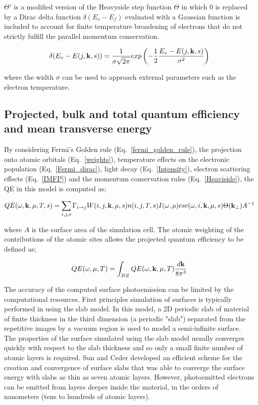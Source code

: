 \documentclass[a4paper,11pt,twoside]{book}
\begin{document}
$\Theta'$ is a modified version of the Heavyside step function $\Theta$ in which $0$ is replaced by a Dirac delta function $\delta(E_v - E_f)$ evaluated with a Gaussian function is included to account for finite temperature broadening of electrons that do not strictly fulfill the parallel momentum conservation.

\begin{equation}
    \delta(E_v - E(j,{\bf{k}},s)) = \frac{1}{\sigma \sqrt{2\pi}}exp \left (-\frac{1}{2}\frac{E_v - E(j,{\bf{k}},s)}{\sigma^2}\right )
    \label{gaussian_vac}
\end{equation}

where the width $\sigma$ can be used to approach external parameters such as the electron temperature.

\subsection{Projected, bulk and total quantum efficiency and mean transverse energy}

By considering Fermi's Golden rule (Eq.~\ref{fermi_golden_rule}), the projection onto atomic orbitals (Eq.~\ref{weights}), temperature effects on the electronic population (Eq.~\ref{Fermi_dirac}), light decay (Eq.~\ref{Intensity}), electron scattering effects (Eq.~\ref{IMFP}) and the momentum conservation rules (Eq.~\ref{Heaviside}), the QE in this model is computed as;

\begin{equation}
QE{(\omega, {\bf{k}},\mu, T, s)}= \sum_{i,j,s} \Gamma_{i \rightarrow j} W( i,j,{\bf{k}},\mu,s) n(i,j,T,s) I(\omega,\mu) esc(\omega,i,{\bf{k}},\mu,s) \Theta({\bf{k}}_\perp)  A^{-1}
    \label{projected_qe}
\end{equation}

where $A$ is the surface area of the simulation cell. The atomic weighting of the contributions of the atomic sites allows the projected quantum efficiency to be defined as;

\begin{equation}
QE{(\omega ,\mu, T)}= \int_{BZ} QE{(\omega, {\bf{k}},\mu, T)}\frac{d{\bf{k}}}{8\pi^3}
    \label{projected_qe}
\end{equation}

The accuracy of the computed surface photoemission can be limited by the computational resources. First principles simulation of surfaces is typically performed in using the slab model. In this model, a 2D periodic slab of material of finite thickness in the third dimension (a periodic "slab") separated from the repetitive images by a vacuum region is used to  model a semi-infinite surface. The properties of the surface simulated using the slab model usually converges quickly with respect to the slab thickness and so only a small finite number of atomic layers is required. Sun and Ceder developed an efficient scheme for the creation and convergence of surface slabs that was able to converge the surface energy with slabs as thin as seven atomic layers. However, photoemitted electrons can be emitted from layers deeper inside the material, in the orders of nanometers (tens to hundreds of atomic layers).
\end{document}
